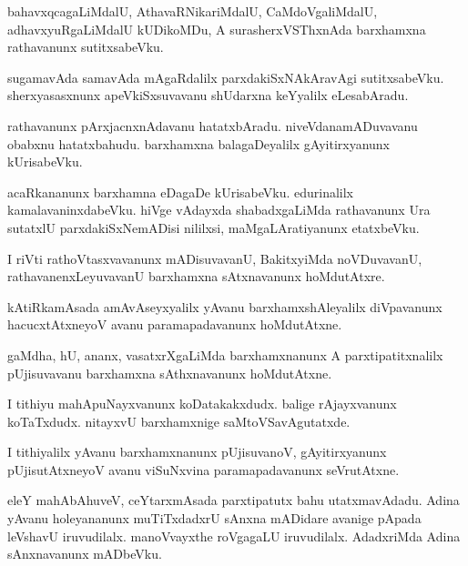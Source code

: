 \documentclass{article}
\begin{document}
\begin{mn}
bahavxqcagaLiMdalU,  AthavaRNikariMdalU, CaMdoVgaliMdalU, adhavxyuRgaLiMdalU  
kUDikoMDu, A  surasherxVSThxnAda  barxhamxna  rathavanunx  sutitxsabeVku.
\end{mn}

\begin{mn}
sugamavAda samavAda  mAgaRdalilx  parxdakiSxNAkAravAgi  sutitxsabeVku.  
sherxyasasxnunx  apeVkiSxsuvavanu  shUdarxna  keYyalilx eLesabAradu.
\end{mn}

\begin{mn}
rathavanunx  pArxjacnxnAdavanu  hatatxbAradu.  niveVdanamADuvavanu  obabxnu  
hatatxbahudu.  barxhamxna  balagaDeyalilx  gAyitirxyanunx kUrisabeVku.
\end{mn}

\begin{mn}
acaRkananunx  barxhamna  eDagaDe  kUrisabeVku.  edurinalilx  kamalavaninxdabeVku.  hiVge  vAdayxda  
shabadxgaLiMda rathavanunx  Ura sutatxlU  parxdakiSxNemADisi  nililxsi, maMgaLAratiyanunx  etatxbeVku.
\end{mn}

\begin{mn}
I riVti  rathoVtasxvavanunx  mADisuvavanU,  BakitxyiMda  noVDuvavanU,  
rathavanenxLeyuvavanU  barxhamxna  sAtxnavanunx  hoMdutAtxre.
\end{mn}

\begin{mn}
kAtiRkamAsada  amAvAseyxyalilx  yAvanu  barxhamxshAleyalilx  diVpavanunx  
hacucxtAtxneyoV  avanu  paramapadavanunx  hoMdutAtxne.
\end{mn}

\begin{mn}
gaMdha,  hU,  ananx,  vasatxrXgaLiMda  barxhamxnanunx  A parxtipatitxnalilx  
pUjisuvavanu  barxhamxna  sAthxnavanunx  hoMdutAtxne.
\end{mn}

\begin{mn}
I tithiyu  mahApuNayxvanunx  koDatakakxdudx.  balige  rAjayxvanunx  koTaTxdudx.  
nitayxvU  barxhamxnige  saMtoVSavAgutatxde.
\end{mn}

\begin{mn}
I tithiyalilx  yAvanu  barxhamxnanunx  pUjisuvanoV,  gAyitirxyanunx  
pUjisutAtxneyoV avanu  viSuNxvina  paramapadavanunx  seVrutAtxne.
\end{mn}

\begin{mn}
eleY  mahAbAhuveV,  ceYtarxmAsada  parxtipatutx  bahu utatxmavAdadu.  Adina  yAvanu  
holeyananunx  muTiTxdadxrU  sAnxna mADidare  avanige  pApada  leVshavU  iruvudilalx.  
manoVvayxthe  roVgagaLU  iruvudilalx.   AdadxriMda  Adina  sAnxnavanunx  mADbeVku.
\end{mn}
\end{document}

